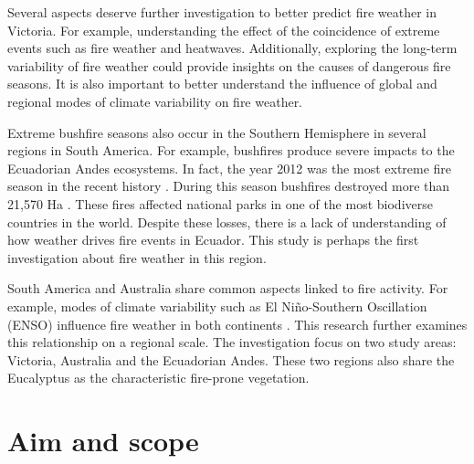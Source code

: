 Several aspects deserve further investigation to better predict fire
weather in Victoria. For example, understanding the effect of the coincidence of extreme
events such as fire weather and heatwaves. Additionally,
exploring the long-term variability of fire weather could provide
insights on the causes of dangerous fire seasons. It is also important
to better understand the influence of global and regional modes of climate
variability on fire weather.

Extreme bushfire seasons also occur in the Southern Hemisphere in several
regions in South America. For example, bushfires produce severe impacts
to the Ecuadorian Andes ecosystems. In fact, the year 2012 was the
most extreme fire season in the recent history \citep{MinisteriodelAmbiente2013,SecretariadeAmbiente2013}.
During this season bushfires destroyed more than 21,570 Ha \citep{MinisteriodelAmbiente2013}.
These fires affected national parks in one of the most biodiverse
countries in the world. Despite these losses, there is a lack of understanding
of how weather drives fire events in Ecuador. This study is perhaps the first
investigation about fire weather in this region. 

South America and Australia share common aspects linked to fire activity.
For example, modes of climate variability such as El Ni\~no-Southern
Oscillation (ENSO) influence fire weather in both continents \citep{Williams1999,Chen2011}.
This research further examines this relationship on a regional scale.
The investigation focus on two study areas: Victoria, Australia and
the Ecuadorian Andes. These two regions also share the Eucalyptus
as the characteristic fire-prone vegetation.


\section{Aim and scope}

